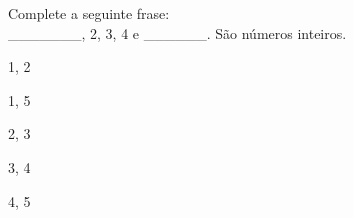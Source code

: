 \question[10]
Complete a seguinte frase:\\
_______, 2, 3, 4 e ______. São números inteiros.
\\
\begin{choices}
\item 1, 2 
\item 1, 5 %
\item 2, 3
\item 3, 4 
\item 4, 5 
\end{choices}
\answerline

